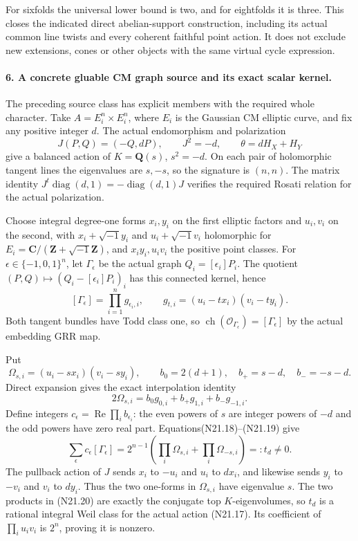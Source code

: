 For sixfolds the universal lower bound is two, and for
eightfolds it is three. This closes the indicated direct
abelian-support construction, including its actual
common line twists and every coherent faithful point
action. It does not exclude new extensions, cones or
other objects with the same virtual cycle expression.

\paragraph{6. A concrete gluable CM graph source and its exact scalar kernel.}
The preceding source class has explicit members with the
required whole character. Take
$A=E_i^n\times E_i^n$, where $E_i$ is the Gaussian CM
elliptic curve, and fix any positive integer $d$.
The actual endomorphism and polarization
\[
 J(P,Q)=(-Q,dP),\qquad J^2=-d,\qquad
                       \theta=dH_X+H_Y
                                                               \tag{N21.17}
\]
give a balanced action of $K=\mathbf Q(s)$, $s^2=-d$.
On each pair of holomorphic tangent lines the eigenvalues
are $s,-s$, so the signature is $(n,n)$.
The matrix identity $J^t\operatorname{diag}(d,1)
=-\operatorname{diag}(d,1)J$ verifies the required
Rosati relation for the actual polarization.

Choose integral degree-one forms $x_i,y_i$ on the first
elliptic factors and $u_i,v_i$ on the second, with
$x_i+\sqrt{-1}y_i$ and $u_i+\sqrt{-1}v_i$ holomorphic
for $E_i=\mathbf C/(\mathbf Z+\sqrt{-1}\mathbf Z)$,
and $x_iy_i,u_iv_i$ the positive point classes.
For $\epsilon\in\{-1,0,1\}^n$, let
$\Gamma_\epsilon$ be the actual graph
$Q_i=[\epsilon_i]P_i$. The quotient
$(P,Q)\mapsto(Q_i-[\epsilon_i]P_i)_i$ has this connected
kernel, hence
\[
 [\Gamma_\epsilon]
       =\prod_{i=1}^n g_{\epsilon_i,i},\qquad
       g_{t,i}=(u_i-tx_i)(v_i-ty_i).
                                                               \tag{N21.18}
\]
Both tangent bundles have Todd class one, so
$\operatorname{ch}(\mathcal O_{\Gamma_\epsilon})
=[\Gamma_\epsilon]$ by the actual embedding GRR map.

Put
\[
 \Omega_{s,i}=(u_i-sx_i)(v_i-sy_i),\qquad
 b_0=2(d+1),\quad b_+=s-d,\quad b_-=-s-d .
\]
Direct expansion gives the exact interpolation identity
\[
               2\Omega_{s,i}
                    =b_0g_{0,i}+b_+g_{1,i}+b_-g_{-1,i}.
                                                               \tag{N21.19}
\]
Define integers
$c_\epsilon=\operatorname{Re}\prod_i b_{\epsilon_i}$:
the even powers of $s$ are integer powers of $-d$ and
the odd powers have zero real part. Equations(N21.18)--(N21.19)
give
\[
 \sum_\epsilon c_\epsilon[\Gamma_\epsilon]
       =2^{n-1}\left(\prod_i\Omega_{s,i}
                                  +\prod_i\Omega_{-s,i}\right)
                              =:t_d\ne0.                     \tag{N21.20}
\]
The pullback action of $J$ sends $x_i$ to $-u_i$ and
$u_i$ to $dx_i$, and likewise sends $y_i$ to $-v_i$
and $v_i$ to $dy_i$. Thus the two one-forms in
$\Omega_{s,i}$ have eigenvalue $s$. The two products in
(N21.20) are exactly the conjugate top $K$-eigenvolumes,
so $t_d$ is a rational integral Weil class for the actual
action (N21.17). Its coefficient of $\prod_i u_iv_i$
is $2^n$, proving it is nonzero.

